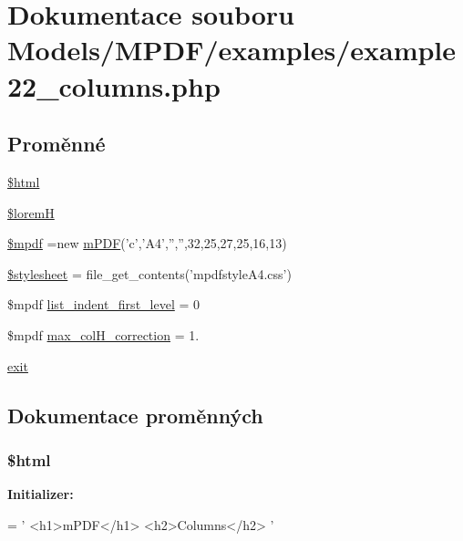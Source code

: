 \hypertarget{example22__columns_8php}{\section{Dokumentace souboru Models/\-M\-P\-D\-F/examples/example22\-\_\-columns.php}
\label{example22__columns_8php}
}
\subsection*{Proměnné}
\begin{DoxyCompactItemize}
\item 
\hyperlink{example22__columns_8php_a6f96e7fc92441776c9d1cd3386663b40}{\$html}
\item 
\hyperlink{example22__columns_8php_afa412b3521b3f79c4a953d445052dc2f}{\$lorem\-H}
\item 
\hyperlink{example22__columns_8php_ad028f81910d6cbab9b184d2214b3a8f8}{\$mpdf} =new \hyperlink{classm_p_d_f}{m\-P\-D\-F}('c','A4','','',32,25,27,25,16,13)
\item 
\hyperlink{example22__columns_8php_a19e5cf73e817c55a49205e6ec78c88a8}{\$stylesheet} = file\-\_\-get\-\_\-contents('mpdfstyle\-A4.\-css')
\item 
\$mpdf \hyperlink{example22__columns_8php_a8780612514d14375709d0685d189579e}{list\-\_\-indent\-\_\-first\-\_\-level} = 0
\item 
\$mpdf \hyperlink{example22__columns_8php_a82223bf6251d986c6d55546c14efc374}{max\-\_\-col\-H\-\_\-correction} = 1.
\item 
\hyperlink{example22__columns_8php_a6733eb5f605d09eaede9845835d71c4e}{exit}
\end{DoxyCompactItemize}


\subsection{Dokumentace proměnných}
\hypertarget{example22__columns_8php_a6f96e7fc92441776c9d1cd3386663b40}{
\subsubsection[{\$html}]{\setlength{\rightskip}{0pt plus 5cm}\$html}}\label{example22__columns_8php_a6f96e7fc92441776c9d1cd3386663b40}
{\bfseries Initializer\-:}
\begin{DoxyCode}
= \textcolor{stringliteral}{'}
\textcolor{stringliteral}{<h1>mPDF</h1>}
\textcolor{stringliteral}{<h2>Columns</h2>}
\textcolor{stringliteral}{'}
\end{DoxyCode}


